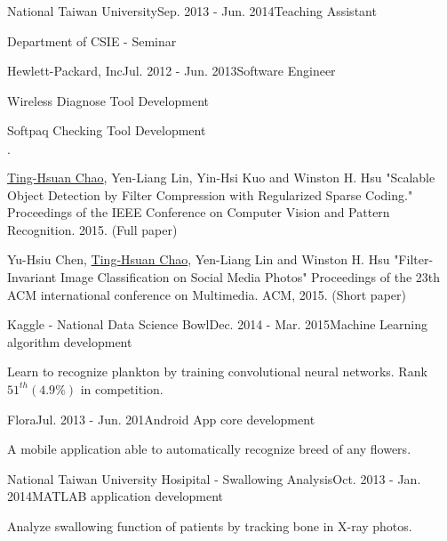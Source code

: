 \documentclass{joel_cv}
\begin{document}
\begin{sectionContentNormal}{National Taiwan University}{Sep. 2013 - Jun. 2014}{Teaching Assistant}
	\item Department of CSIE - Seminar
\end{sectionContentNormal}

\begin{sectionContentNormal}{Hewlett-Packard, Inc}{Jul. 2012 - Jun. 2013}{Software Engineer}
	\item Wireless Diagnose Tool Development
	\item Softpaq Checking Tool Development
\end{sectionContentNormal}

%
%

\begin{sectionItemize}{$\cdot$}
	\item \underline{Ting-Hsuan Chao}, Yen-Liang Lin, Yin-Hsi Kuo and Winston H. Hsu "Scalable Object Detection by Filter Compression with Regularized Sparse Coding." Proceedings of the IEEE Conference on Computer Vision and Pattern Recognition. 2015. (Full paper)
	\item Yu-Hsiu Chen, \underline{Ting-Hsuan Chao},  Yen-Liang Lin and Winston H. Hsu "Filter-Invariant Image Classification on Social Media Photos" Proceedings of the 23th ACM international conference on Multimedia. ACM, 2015. (Short paper)
\end{sectionItemize}

\pagebreak


%
%


\begin{sectionContentNormal}{Kaggle - National Data Science Bowl}{Dec. 2014 - Mar. 2015}{Machine Learning algorithm development}
	\item Learn to recognize plankton by training convolutional neural networks. Rank $51^{th} (4.9\%)$ in competition.
\end{sectionContentNormal}

\begin{sectionContentNormal}{Flora}{Jul. 2013 - Jun. 201}{Android App core development}
	\item A mobile application able to automatically recognize breed of any flowers.
\end{sectionContentNormal}

\begin{sectionContentNormal}{National Taiwan University Hosipital - Swallowing Analysis}{Oct. 2013 - Jan. 2014}{MATLAB application development}
	\item Analyze swallowing function of patients by tracking bone in X-ray photos.
\end{sectionContentNormal}
\end{document}
